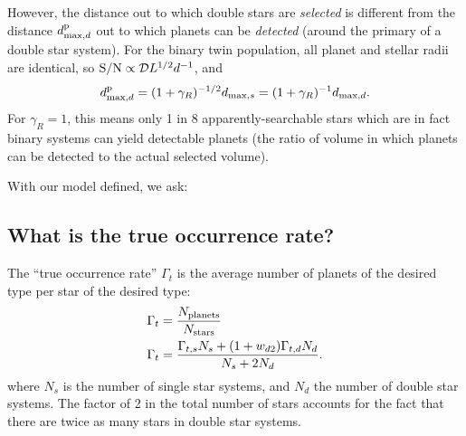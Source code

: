 \documentclass{emulateapj}
\begin{document}
However, the distance out to which double stars are {\it selected} is 
different from the distance $d_{{\rm max},d}^{\rm p}$ out to which planets can 
be {\it detected} (around the primary of a double star system).
For the binary twin population, all planet and stellar radii are identical, so 
${\rm S/N} \propto \mathcal{D} L^{1/2} d^{-1}$, and
\begin{equation}
d_{{\rm max},d}^{\rm p} = (1 + \gamma_R)^{-1/2} d_{{\rm max},s} = 
(1 + \gamma_R)^{-1} d_{{\rm max},d}.
\end{equation}
For $\gamma_R = 1$, this means only 1 in 8 apparently-searchable stars which 
are in fact binary systems can yield detectable planets (the ratio of 
volume in which planets can be detected to the actual selected volume).

  

With our model defined, we ask:

\subsection{What is the true occurrence rate?}
\label{sec:true_rate}

The ``true occurrence rate'' $\Gamma_t$ is the average number of planets of 
the desired type per star of the desired type:
\begin{align}
\Gamma_t &= \frac{N_{\rm planets}}{N_{\rm stars}} \\
\Gamma_t &= \frac{\Gamma_{t,s} N_s + (1+w_{d2}) \Gamma_{t,d} N_d}{N_s + 2N_d}.
\label{eq:true_occ}
\end{align}
where $N_s$ is the number of single star systems, and $N_d$ the number of 
double star systems. 
The factor of 2 in the total number of stars accounts for the fact that there 
are twice as many stars in double star systems.
\end{document}
